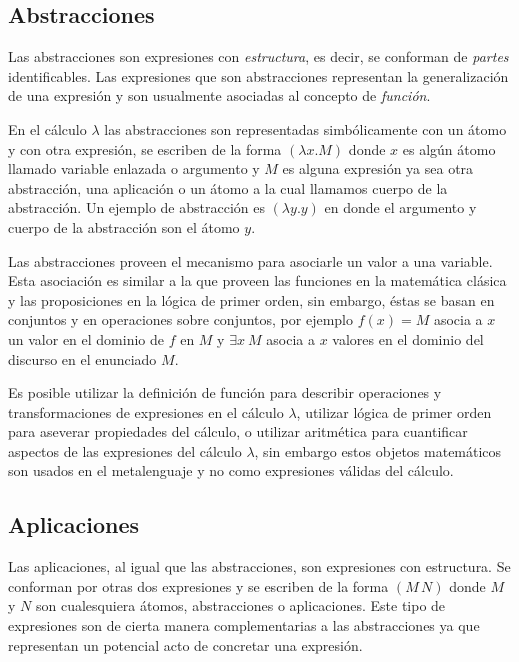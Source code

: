 \subsection{Abstracciones}
\label{sec:abstracciones}

Las abstracciones son expresiones con \emph{estructura}, es decir, se conforman de \emph{partes} identificables. Las expresiones que son abstracciones representan la generalización de una expresión y son usualmente asociadas al concepto de \emph{función}.

En el cálculo \( λ \) las abstracciones son representadas simbólicamente con un átomo y con otra expresión, se escriben de la forma \( (λx.M) \) donde \( x \) es algún átomo llamado variable enlazada o argumento y \( M \) es alguna expresión ya sea otra abstracción, una aplicación o un átomo a la cual llamamos cuerpo de la abstracción. Un ejemplo de abstracción es \( (λy.y) \) en donde el argumento y cuerpo de la abstracción son el átomo \( y \).

Las abstracciones proveen el mecanismo para asociarle un valor a una variable. Esta asociación es similar a la que proveen las funciones en la matemática clásica y las proposiciones en la lógica de primer orden, sin embargo, éstas se basan en conjuntos y en operaciones sobre conjuntos, por ejemplo \( f(x)=M \) asocia a \( x \) un valor en el dominio de \( f \) en \( M \) y \( \exists x\ M \) asocia a \( x \) valores en el dominio del discurso en el enunciado \( M \).

Es posible utilizar la definición de función para describir operaciones y transformaciones de expresiones en el cálculo \( λ \), utilizar lógica de primer orden para aseverar propiedades del cálculo, o utilizar aritmética para cuantificar aspectos de las expresiones del cálculo \( λ \), sin embargo estos objetos matemáticos son usados en el metalenguaje y no como expresiones válidas del cálculo.


\subsection{Aplicaciones}
\label{sec:aplicaciones}

Las aplicaciones, al igual que las abstracciones, son expresiones con estructura. Se conforman por otras dos expresiones y se escriben de la forma \( (M\, N) \) donde \( M \) y \( N \) son cualesquiera átomos, abstracciones o aplicaciones. Este tipo de expresiones son de cierta manera complementarias a las abstracciones ya que representan un potencial acto de concretar una expresión.

